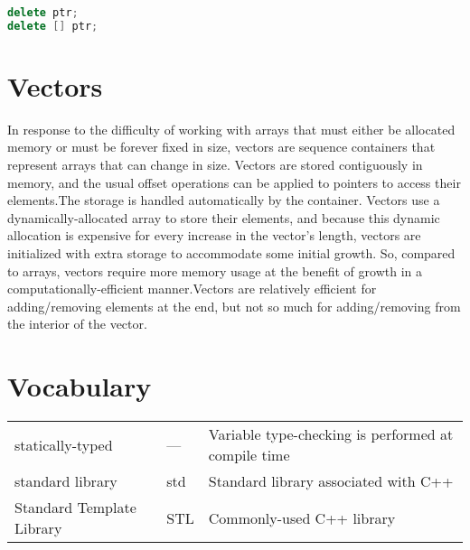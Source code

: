 \documentclass[10pt]{article}
\begin{document}
\begin{lstlisting}[language=C++]
delete ptr;
delete [] ptr;
\end{lstlisting}

\section{Vectors}

In response to the difficulty of working with arrays that must either be allocated memory or must be forever fixed in size, vectors are sequence containers that represent arrays that can change in size. Vectors are stored contiguously in memory, and the usual offset operations can be applied to pointers to access their elements.The storage is handled automatically by the container. Vectors use a dynamically-allocated array to store their elements, and because this dynamic allocation is expensive for every increase in the vector's length, vectors are initialized with extra storage to accommodate some initial growth. So, compared to arrays, vectors require more memory usage at the benefit of growth in a computationally-efficient manner.Vectors are relatively efficient for adding/removing elements at the end, but not so much for adding/removing from the interior of the vector.




\section{Vocabulary}

\begin{tabular}{l l l}
statically-typed & --- & Variable type-checking is performed at compile time\\
standard library & std & Standard library associated with C++\\
Standard Template Library & STL & Commonly-used C++ library\\
\end{tabular}
\end{document}
